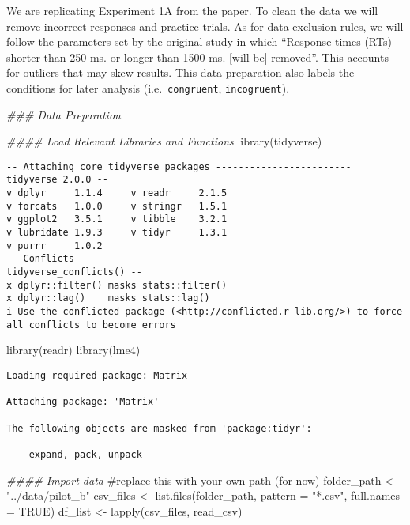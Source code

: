 \documentclass[
  letterpaper,
  DIV=11,
  numbers=noendperiod]{scrartcl}
\newenvironment{Shaded}{\begin{snugshade}}{\end{snugshade}}
\newcommand{\AttributeTok}[1]{\textcolor[rgb]{0.40,0.45,0.13}{#1}}
\newcommand{\CommentTok}[1]{\textcolor[rgb]{0.37,0.37,0.37}{#1}}
\newcommand{\ConstantTok}[1]{\textcolor[rgb]{0.56,0.35,0.01}{#1}}
\newcommand{\DocumentationTok}[1]{\textcolor[rgb]{0.37,0.37,0.37}{\textit{#1}}}
\newcommand{\FunctionTok}[1]{\textcolor[rgb]{0.28,0.35,0.67}{#1}}
\newcommand{\NormalTok}[1]{\textcolor[rgb]{0.00,0.23,0.31}{#1}}
\newcommand{\OtherTok}[1]{\textcolor[rgb]{0.00,0.23,0.31}{#1}}
\newcommand{\StringTok}[1]{\textcolor[rgb]{0.13,0.47,0.30}{#1}}
\begin{document}
We are replicating Experiment 1A from the paper. To clean the data we
will remove incorrect responses and practice trials. As for data
exclusion rules, we will follow the parameters set by the original study
in which ``Response times (RTs) shorter than 250 ms. or longer than 1500
ms. {[}will be{]} removed''. This accounts for outliers that may skew
results. This data preparation also labels the conditions for later
analysis (i.e.~\texttt{congruent}, \texttt{incogruent}).

\begin{Shaded}
\begin{Highlighting}[]
\DocumentationTok{\#\#\# Data Preparation}

\DocumentationTok{\#\#\#\# Load Relevant Libraries and Functions}
\FunctionTok{library}\NormalTok{(tidyverse)}
\end{Highlighting}
\end{Shaded}

\begin{verbatim}
-- Attaching core tidyverse packages ------------------------ tidyverse 2.0.0 --
v dplyr     1.1.4     v readr     2.1.5
v forcats   1.0.0     v stringr   1.5.1
v ggplot2   3.5.1     v tibble    3.2.1
v lubridate 1.9.3     v tidyr     1.3.1
v purrr     1.0.2     
-- Conflicts ------------------------------------------ tidyverse_conflicts() --
x dplyr::filter() masks stats::filter()
x dplyr::lag()    masks stats::lag()
i Use the conflicted package (<http://conflicted.r-lib.org/>) to force all conflicts to become errors
\end{verbatim}

\begin{Shaded}
\begin{Highlighting}[]
\FunctionTok{library}\NormalTok{(readr)}
\FunctionTok{library}\NormalTok{(lme4)}
\end{Highlighting}
\end{Shaded}

\begin{verbatim}
Loading required package: Matrix

Attaching package: 'Matrix'

The following objects are masked from 'package:tidyr':

    expand, pack, unpack
\end{verbatim}

\begin{Shaded}
\begin{Highlighting}[]
\DocumentationTok{\#\#\#\# Import data}
\CommentTok{\#replace this with your own path (for now)}
\NormalTok{folder\_path }\OtherTok{\textless{}{-}} \StringTok{"../data/pilot\_b"}
\NormalTok{csv\_files }\OtherTok{\textless{}{-}} \FunctionTok{list.files}\NormalTok{(folder\_path, }\AttributeTok{pattern =} \StringTok{"*.csv"}\NormalTok{, }\AttributeTok{full.names =} \ConstantTok{TRUE}\NormalTok{)}
\NormalTok{df\_list }\OtherTok{\textless{}{-}} \FunctionTok{lapply}\NormalTok{(csv\_files, read\_csv)}
\end{Highlighting}
\end{Shaded}
\end{document}
